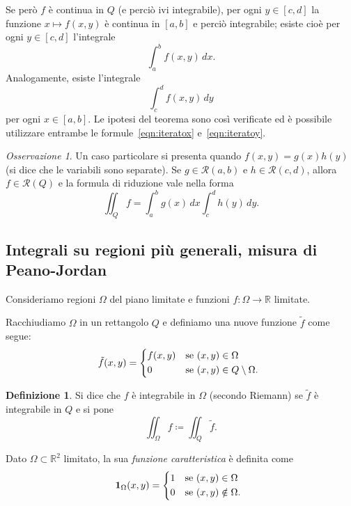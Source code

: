 \documentclass[a4paper]{book}
\numberwithin{equation}{section}
\theoremstyle{plain}
\theoremstyle{definition}
\newtheorem{defn}{Definizione}[section]
\theoremstyle{remark}
\newtheorem{oss}{Osservazione}[section]
\theoremstyle{example}
\begin{document}
Se però $f$ è continua in $Q$ (e perciò ivi integrabile), per ogni $y \in [c,d]$ la funzione $x \mapsto f(x, y)$ è continua in $[a, b]$ e perciò integrabile; esiste cioè per ogni $y \in [c, d]$ l'integrale
	\begin{equation*}
	\int_a^b f(x,y) \, dx.
	\end{equation*}
Analogamente, esiste l'integrale
	\begin{equation*}
	\int_c^d f(x,y) \, dy
	\end{equation*}
per ogni $x \in [a, b]$. Le ipotesi del teorema sono così verificate ed è possibile utilizzare entrambe le formule~\eqref{eqn:iteratox} e~\eqref{eqn:iteratoy}.

\begin{oss}
Un caso particolare si presenta quando $f(x,y) = g(x)h(y)$ (si dice che le variabili sono separate). Se $g \in \mathcal{R}(a,b)$ e $h \in \mathcal{R}(c, d)$, allora $f \in \mathcal{R}(Q)$ e la formula di riduzione vale nella forma
	\begin{equation}
	\iint_Q f = \int_a^b g(x) \, dx \int_c^d h(y)\,dy.
	\end{equation}
\end{oss}

\subsection{Integrali su regioni più generali, misura di Peano-Jordan}
Consideriamo regioni $\Omega$ del piano limitate e funzioni $f \colon \Omega \to \mathbb{R}$ limitate.

Racchiudiamo $\Omega$ in un rettangolo $Q$ e definiamo una nuove funzione $\tilde{f}$ come segue:
	\begin{equation}
	\tilde{f}(x, y) = \begin{dcases*}
	f(x,y) &se $(x, y) \in \Omega$ \\
	0 &se $(x, y) \in Q\setminus \Omega$.
	\end{dcases*}
	\end{equation}

\begin{defn}
Si dice che $f$ è integrabile in $\Omega$ (secondo Riemann) se $\tilde{f}$ è integrabile in $Q$ e si pone
	\begin{equation*}
	\iint_{\Omega} f \coloneqq \iint_Q \tilde{f}.
	\end{equation*}
\end{defn}

Dato $\Omega \subset \mathbb{R}^2$ limitato, la sua \emph{funzione caratteristica} è definita come
	\begin{equation*}
	\mathbf{1}_{\Omega}(x, y) = \begin{dcases*}
	1 &se $(x, y) \in \Omega$ \\
	0 &se $(x, y) \notin \Omega$.
	\end{dcases*}
	\end{equation*}
\end{document}
